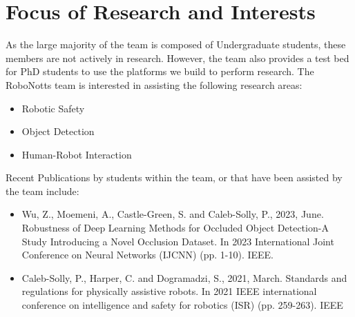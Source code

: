 \section{Focus of Research and Interests}

As the large majority of the team is composed of Undergraduate students, these members are not actively in research. However, the team also provides a test bed for PhD students to use the platforms we build to perform research. The RoboNotts team is interested in assisting the following research areas:

\begin{itemize}
  \item Robotic Safety
  \item Object Detection 
  \item Human-Robot Interaction
\end{itemize}

Recent Publications by students within the team, or that have been assisted by the team include:

\begin{itemize}

\small

  \item Wu, Z., Moemeni, A., Castle-Green, S. and Caleb-Solly, P., 2023, June. Robustness of Deep Learning Methods for Occluded Object Detection-A Study Introducing a Novel Occlusion Dataset. In 2023 International Joint Conference on Neural Networks (IJCNN) (pp. 1-10). IEEE.
  \item Caleb-Solly, P., Harper, C. and Dogramadzi, S., 2021, March. Standards and regulations for physically assistive robots. In 2021 IEEE international conference on intelligence and safety for robotics (ISR) (pp. 259-263). IEEE
\end{itemize}

